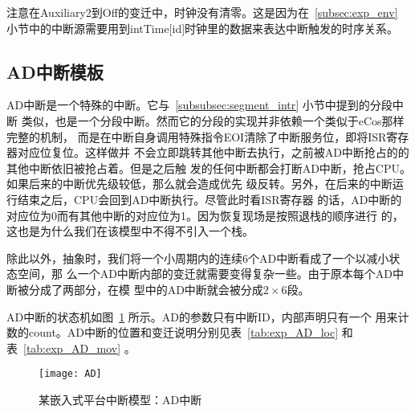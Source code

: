 注意在Auxiliary2到Off的变迁中，时钟没有清零。这是因为在~\ref{subsec:exp_env} 
小节中的中断源需要用到intTime[id]时钟里的数据来表达中断触发的时序关系。

\subsection{AD中断模板}
\label{subsec:exp_ad}

AD中断是一个特殊的中断。它与~\ref{subsubsec:segment_intr} 小节中提到的分段中断
类似，也是一个分段中断。然而它的分段的实现并非依赖一个类似于eCos那样完整的机制，
而是在中断自身调用特殊指令EOI清除了中断服务位，即将ISR寄存器对应位复位。这样做并
不会立即跳转其他中断去执行，之前被AD中断抢占的的其他中断依旧被抢占着。但是之后触
发的任何中断都会打断AD中断，抢占CPU。如果后来的中断优先级较低，那么就会造成优先
级反转。另外，在后来的中断运行结束之后，CPU会回到AD中断执行。尽管此时看ISR寄存器
的话，AD中断的对应位为0而有其他中断的对应位为1。因为恢复现场是按照退栈的顺序进行
的，这也是为什么我们在该模型中不得不引入一个栈。

除此以外，抽象时，我们将一个小周期内的连续6个AD中断看成了一个以减小状态空间，那
么一个AD中断内部的变迁就需要变得复杂一些。由于原本每个AD中断被分成了两部分，在模
型中的AD中断就会被分成$2\times 6$段。

AD中断的状态机如图~\ref{fig:exp_AD} 所示。AD的参数只有中断ID，内部声明只有一个
用来计数的count。AD中断的位置和变迁说明分别见表~\ref{tab:exp_AD_loc} 和
表~\ref{tab:exp_AD_mov} 。

\begin{figure}[H]
	\centering
	\texttt{[image: AD]}
	\caption{某嵌入式平台中断模型：AD中断}
	\label{fig:exp_AD}
\end{figure}

